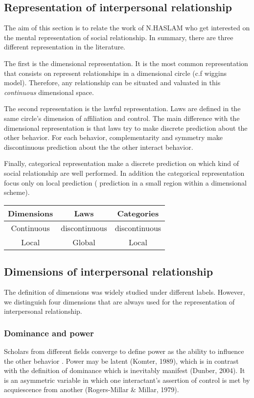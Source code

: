 \documentclass{llncs}
\begin{document}
\subsection{Representation of interpersonal relationship}

The aim of this section is to relate the work of N.HASLAM who get interested on the mental representation of social relationship. In summary, there are three different representation in the literature. 
\par The first is the dimensional representation. It is the most common representation that consists on represent relationships in a dimensional circle (c.f wiggins model). Therefore, any relationship can be situated and valuated  in this  \textit{continuous} dimensional space. 

The second representation is the lawful representation. Laws are defined in the same circle's dimension of affiliation and control. The main difference with the dimensional representation is that laws try to make discrete prediction about the other behavior. For each behavior, complementarity and symmetry make discontinuous prediction about the the other interact behavior. 

Finally, categorical representation  make a discrete prediction on which kind of social relationship are well performed. In addition the categorical representation focus only on local prediction ( prediction in a small region within a dimensional scheme).

\begin{tabular}{|c|c|c|}
  \hline
  Dimensions & Laws & Categories \\
  \hline
  	Continuous &   discontinuous   &   discontinuous  \\
 	Local & Global & Local\\
  \hline
\end{tabular}

\subsection{Dimensions of interpersonal relationship}
The definition of dimensions was widely studied under different labels. However, we distinguish four dimensions that are always used for the representation of interpersonal relationship. 
\subsubsection{Dominance and power}
Scholars from different fields converge to define power as the ability to influence the other behavior \cite{svennevig2000getting}. Power may be latent (Komter, 1989), which is in contrast with the definition of dominance which is inevitably manifest (Dunber, 2004). It is an asymmetric variable in which one interactant's assertion of control is met by acquiescence from another (Rogers-Millar \& Millar, 1979). 
\end{document}
